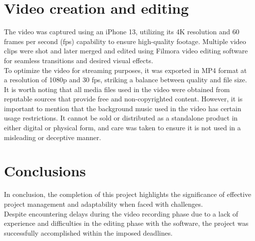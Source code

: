\documentclass[eng]{class}
\begin{document}
\section{Video creation and editing}
The video was captured using an iPhone 13, utilizing its 4K resolution and 60 frames per second (fps) capability to ensure high-quality footage.
Multiple video clips were shot and later merged and edited using Filmora video editing software for seamless transitions and desired visual effects.\\
To optimize the video for streaming purposes, it was exported in MP4 format at a resolution of 1080p and 30 fps, striking a balance between quality and file size.\\
It is worth noting that all media files used in the video were obtained from reputable sources that provide free and non-copyrighted content.
However, it is important to mention that the background music used in the video has certain usage restrictions.
It cannot be sold or distributed as a standalone product in either digital or physical form, and care was taken to ensure
it is not used in a misleading or deceptive manner.
\section{Conclusions}
In conclusion, the completion of this project highlights
the significance of effective project management and adaptability when faced with challenges.\\
Despite encountering delays during the video recording phase due to a lack of experience and difficulties in the editing phase with the software,
the project was successfully accomplished within the imposed deadlines.
\end{document}
